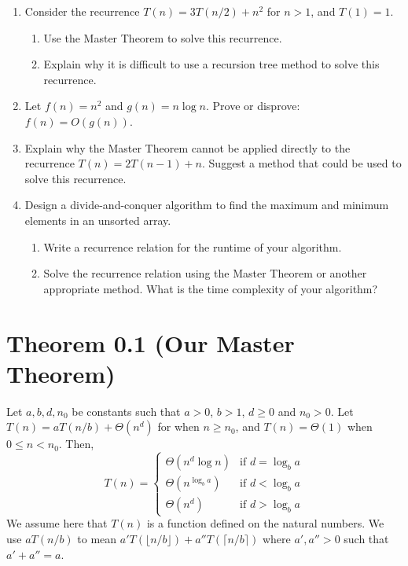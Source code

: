 \documentclass{article}
\begin{document}
\begin{enumerate}
    \item  Consider the recurrence $T(n) = 3T(n/2) + n^2$ for $n > 1$, and $T(1) = 1$.
    \begin{enumerate}
        \item Use the Master Theorem to solve this recurrence.
        \item Explain why it is difficult to use a recursion tree method to solve this recurrence.
    \end{enumerate}

    \item Let $f(n) = n^2$ and $g(n) = n \log n$. Prove or disprove: $f(n) = O(g(n))$.

    \item  Explain why the Master Theorem cannot be applied directly to the recurrence $T(n) = 2T(n-1) + n$.  Suggest a method that could be used to solve this recurrence.

    \item Design a divide-and-conquer algorithm to find the maximum and minimum elements in an unsorted array.
        \begin{enumerate}
            \item Write a recurrence relation for the runtime of your algorithm.
            \item Solve the recurrence relation using the Master Theorem or another appropriate method.  What is the time complexity of your algorithm?
        \end{enumerate}

\end{enumerate}

\section*{Theorem 0.1 (Our Master Theorem)}
Let $a, b, d, n_0$ be constants such that $a > 0$, $b > 1$, $d \ge 0$ and $n_0 > 0$.
Let $T(n) = aT(n/b) + \Theta(n^d)$ for when $n \ge n_0$, and $T(n) = \Theta(1)$ when $0 \le n < n_0$. Then,
\[
T(n) = \begin{cases}
\Theta(n^d \log n) & \text{if } d = \log_b a \\
\Theta(n^{\log_b a}) & \text{if } d < \log_b a \\
\Theta(n^d) & \text{if } d > \log_b a
\end{cases}
\]
We assume here that $T(n)$ is a function defined on the natural numbers. We use $aT(n/b)$ to mean $a'T(\lfloor n/b \rfloor) + a''T(\lceil n/b \rceil)$ where $a', a'' > 0$ such that $a' + a'' = a$.
\end{document}
